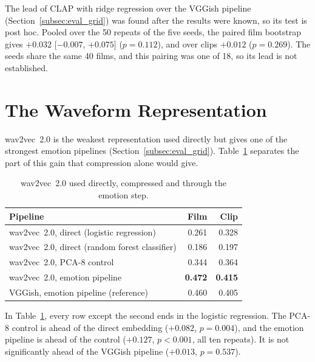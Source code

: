 The lead of CLAP with ridge regression over the VGGish pipeline (Section~\ref{subsec:eval_grid})
was found after the results were known, so its test is post hoc. Pooled over the 50 repeats of the five seeds, the paired film bootstrap gives $+0.032$
[$-0.007$, $+0.075$] ($p=0.112$), and over clips $+0.012$ ($p=0.269$). The seeds share the
same 40 films, and this pairing was one of 18, so its lead is not established.

\section{The Waveform Representation}
\label{sec:app_waveform}

wav2vec~2.0 is the weakest representation used directly but gives one of the strongest
emotion pipelines (Section~\ref{subsec:eval_grid}). Table~\ref{tab:app_w2v} separates the
part of this gain that compression alone would give.

\begin{table}[H]
  \centering
  \small
  \caption{wav2vec~2.0 used directly, compressed and through the emotion step.}
  \label{tab:app_w2v}
  \begin{tabular}{lrr}
    \toprule
    Pipeline & Film & Clip \\
    \midrule
    wav2vec~2.0, direct (logistic regression)      & 0.261 & 0.328 \\
    wav2vec~2.0, direct (random forest classifier) & 0.186 & 0.197 \\
    wav2vec~2.0, PCA-8 control                     & 0.344 & 0.364 \\
    wav2vec~2.0, emotion pipeline                  & \textbf{0.472} & \textbf{0.415} \\
    \midrule
    VGGish, emotion pipeline (reference)           & 0.460 & 0.405 \\
    \bottomrule
  \end{tabular}
\end{table}

In Table~\ref{tab:app_w2v}, every row except the second ends in the logistic regression. The
PCA-8 control is ahead of the direct embedding ($+0.082$, $p=0.004$), and the emotion
pipeline is ahead of the control ($+0.127$, $p<0.001$, all ten repeats). It is not significantly ahead of the VGGish pipeline ($+0.013$, $p=0.537$).

